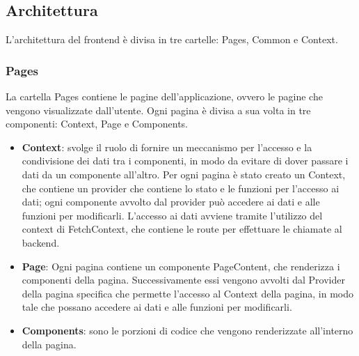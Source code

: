 \subsection{Architettura}
L'architettura del frontend è divisa in tre cartelle: Pages, Common e Context.

\subsubsection{Pages}
La cartella Pages contiene le pagine dell'applicazione, ovvero le pagine che vengono visualizzate dall'utente. Ogni pagina è divisa a sua volta in tre componenti: Context, Page e Components.\\

\begin{itemize}
    \item \textbf{Context}: svolge il ruolo di fornire un meccanismo per l'accesso e la condivisione dei dati tra i componenti, in modo da evitare di dover passare i dati da un componente all'altro. Per ogni pagina è stato creato un Context, che contiene un provider che contiene lo stato e le funzioni per l'accesso ai dati; ogni componente avvolto dal provider può accedere ai dati e alle funzioni per modificarli. L'accesso ai dati avviene tramite l'utilizzo del context di FetchContext, che contiene le route per effettuare le chiamate al backend.\\
    \item \textbf{Page}: Ogni pagina contiene un componente PageContent, che renderizza i componenti della pagina. Successivamente essi vengono avvolti dal Provider della pagina specifica che permette l'accesso al Context della pagina, in modo tale che possano accedere ai dati e alle funzioni per modificarli.\\
    \item \textbf{Components}: sono le porzioni di codice che vengono renderizzate all'interno della pagina.
\end{itemize}
